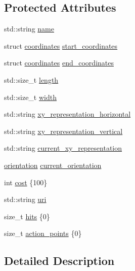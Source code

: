 \subsection*{Protected Attributes}
\begin{DoxyCompactItemize}
\item 
std\+::string \hyperlink{classbattle__ship_1_1vessel_a7c7d199acda1b8914c1b014d7d2893b3}{name}
\item 
struct \hyperlink{structbattle__ship_1_1coordinates}{coordinates} \hyperlink{classbattle__ship_1_1vessel_a32625627454fc279169a7d94ef460cd4}{start\+\_\+coordinates}
\item 
struct \hyperlink{structbattle__ship_1_1coordinates}{coordinates} \hyperlink{classbattle__ship_1_1vessel_a90baf292572ee968095c107ec656db32}{end\+\_\+coordinates}
\item 
std\+::size\+\_\+t \hyperlink{classbattle__ship_1_1vessel_a90930f7a8a9a45cb29ca434afa5e34ec}{length}
\item 
std\+::size\+\_\+t \hyperlink{classbattle__ship_1_1vessel_a5fec62ed2032bb672db385ecc85339cb}{width}
\item 
std\+::string \hyperlink{classbattle__ship_1_1vessel_a563ede7bcd45c64f897f727ce2ca50ff}{xy\+\_\+representation\+\_\+horizontal}
\item 
std\+::string \hyperlink{classbattle__ship_1_1vessel_a7ab3092931ae7f230cb2cca77f2612c5}{xy\+\_\+representation\+\_\+vertical}
\item 
std\+::string \hyperlink{classbattle__ship_1_1vessel_ac49c1b9fd8b63846dac12053cebb1d00}{current\+\_\+xy\+\_\+representation}
\item 
\hyperlink{namespacebattle__ship_aed87488f0a73f0d0679fe343fb61c784}{orientation} \hyperlink{classbattle__ship_1_1vessel_ae0e05c0f43e6fe6c01bf1534ebece971}{current\+\_\+orientation}
\item 
int \hyperlink{classbattle__ship_1_1vessel_aaf2677260fd0f0ce56678cd23b8a0591}{cost} \{100\}
\item 
std\+::string \hyperlink{classbattle__ship_1_1vessel_a13cfef1f532ae80be7187a65e59c8b46}{uri}
\item 
size\+\_\+t \hyperlink{classbattle__ship_1_1vessel_a1a14cc37d607ba7f3b710b36a11ff2e0}{hits} \{0\}
\item 
size\+\_\+t \hyperlink{classbattle__ship_1_1vessel_a5d2b710e2b58847818ba8e22794a97a4}{action\+\_\+points} \{0\}
\end{DoxyCompactItemize}


\subsection{Detailed Description}



